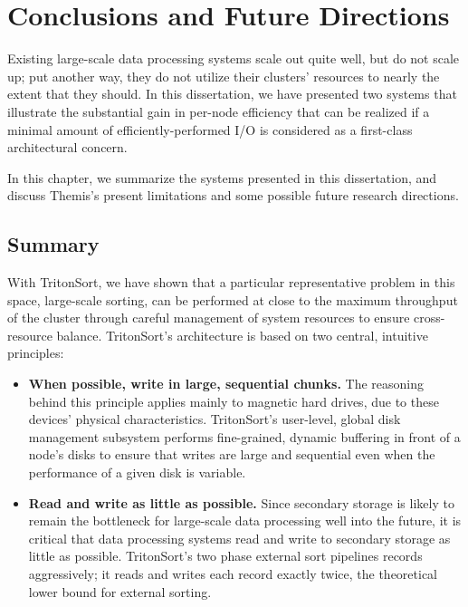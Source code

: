 \chapter{Conclusions and Future Directions}
\label{chapter:conclusions}

Existing large-scale data processing systems scale out quite well, but do not
scale up; put another way, they do not utilize their clusters' resources to
nearly the extent that they should. In this dissertation, we have presented
two systems that illustrate the substantial gain in per-node efficiency that
can be realized if a minimal amount of efficiently-performed I/O is considered
as a first-class architectural concern.

In this chapter, we summarize the systems presented in this dissertation, and
discuss Themis's present limitations and some possible future research
directions.

\section{Summary}

With TritonSort, we have shown that a particular representative problem in this
space, large-scale sorting, can be performed at close to the maximum throughput
of the cluster through careful management of system resources to ensure
cross-resource balance. TritonSort's architecture is based on two central,
intuitive principles:

\begin{itemize}
  \item \textbf{When possible, write in large, sequential chunks.} The
    reasoning behind this principle applies mainly to magnetic hard drives, due
    to these devices' physical characteristics. TritonSort's user-level, global
    disk management subsystem performs fine-grained, dynamic buffering in front
    of a node's disks to ensure that writes are large and sequential even when
    the performance of a given disk is variable.
  \item \textbf{Read and write as little as possible.} Since secondary storage
    is likely to remain the bottleneck for large-scale data processing well
    into the future, it is critical that data processing systems read and write
    to secondary storage as little as possible. TritonSort's two phase external
    sort pipelines records aggressively; it reads and writes each record
    exactly twice, the theoretical lower bound for external sorting.
\end{itemize}

